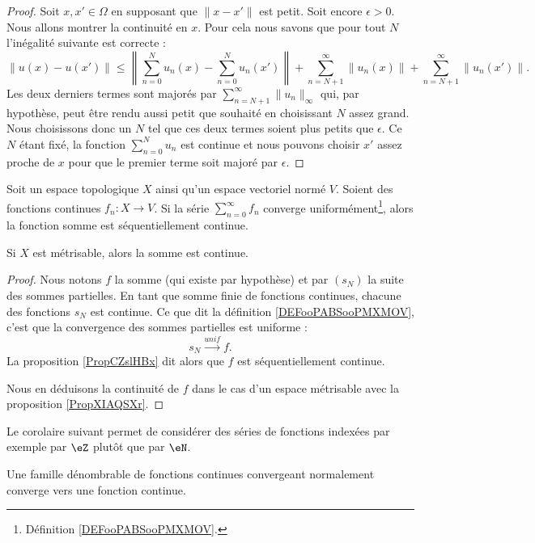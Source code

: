 \begin{proof}
	Soit \( x,x'\in \Omega\) en supposant que \( \| x-x' \|\) est petit. Soit encore \( \epsilon>0\). Nous allons montrer la continuité en \( x\). Pour cela nous savons que pour tout \( N\) l'inégalité suivante est correcte :
	\begin{equation}
		\| u(x)-u(x') \|\leq \left\|  \sum_{n=0}^Nu_n(x)-\sum_{n=0}^{N}u_n(x') \right\|+\sum_{n=N+1}^{\infty}\| u_n(x) \|+\sum_{n=N+1}^{\infty}\| u_n(x') \|.
	\end{equation}
	Les deux derniers termes sont majorés par \( \sum_{n=N+1}^{\infty}\| u_n \|_{\infty}\) qui, par hypothèse, peut être rendu aussi petit que souhaité en choisissant \( N\) assez grand. Nous choisissons donc un \( N\) tel que ces deux termes soient plus petits que \( \epsilon\). Ce \( N\) étant fixé, la fonction \( \sum_{n=0}^{N}u_n\) est continue et nous pouvons choisir \( x'\) assez proche de \( x\) pour que le premier terme soit majoré par \( \epsilon\).
\end{proof}

\begin{theorem}			\label{ThoSerUnifCont}
	Soit un espace topologique \( X\) ainsi qu'un espace vectoriel normé \( V\). Soient des fonctions continues \( f_n\colon X\to V\). Si la série \( \sum_{n=0}^{\infty}f_n\) converge uniformément\footnote{Définition \ref{DEFooPABSooPMXMOV}.}, alors la fonction somme est séquentiellement continue.

	Si \( X\) est métrisable, alors la somme est continue.
\end{theorem}

\begin{proof}
	Nous notons \( f\) la somme (qui existe par hypothèse) et par \( (s_N)\) la suite des sommes partielles. En tant que somme finie de fonctions continues, chacune des fonctions \( s_N\) est continue. Ce que dit la définition \ref{DEFooPABSooPMXMOV}, c'est que la convergence des sommes partielles est uniforme :
	\begin{equation}
		s_N\stackrel{unif}{\longrightarrow}f.
	\end{equation}
	La proposition \ref{PropCZslHBx} dit alors que \( f\) est séquentiellement continue.

	Nous en déduisons la continuité de \( f\) dans le cas d'un espace métrisable avec la proposition \ref{PropXIAQSXr}.
\end{proof}

Le corolaire suivant permet de considérer des séries de fonctions indexées par exemple par \( \eZ\) plutôt que par \( \eN\).
\begin{corollary}
	Une famille dénombrable de fonctions continues convergeant normalement converge vers une fonction continue.
\end{corollary}

